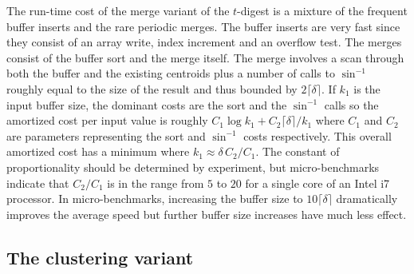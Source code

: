 \documentclass[11pt]{amsart}
\begin{document}
The run-time cost of the merge variant of the $t$-digest is a mixture of the frequent buffer inserts  and the rare periodic merges. The buffer inserts are very fast since they consist of an array write, index increment and an overflow test. The merges consist of the buffer sort and the merge itself. The merge involves a scan through both the buffer and the existing centroids plus a number of calls to $\sin^{-1}$ roughly equal to the size of the result and thus bounded by $2 \lceil \delta \rceil$. If $k_1$ is the input buffer size, the dominant costs are the sort and the $\sin^{-1}$ calls so the amortized cost per input value is roughly $C_1 \log k_1 + C_2 \lceil \delta \rceil / k_1$ where $C_1$ and $C_2$ are parameters representing the sort and $\sin^{-1}$ costs respectively. This overall amortized cost has a minimum where $k_1 \approx \delta\, C_2  / C_1$. The constant of proportionality should be determined by experiment, but micro-benchmarks indicate that $C_2 / C_1$ is in the range from $5$ to $20$ for a single core of an Intel i7 processor. In micro-benchmarks, increasing the buffer size to $10 \lceil \delta \rceil$ dramatically improves the average speed but further buffer size increases have much less effect.

\subsection{The clustering variant}

\end{document}
